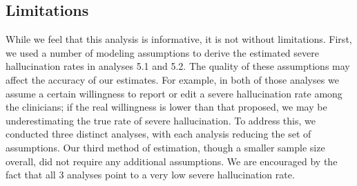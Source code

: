 \documentclass{style/myclass}
\begin{document}
\subsection{Limitations}

While we feel that this analysis is informative, it is not without limitations. First, we used a number of modeling assumptions to derive the estimated severe hallucination rates in analyses 5.1 and 5.2. The quality of these assumptions may affect the accuracy of our estimates. For example, in both of those analyses we assume a certain willingness to report or edit a severe hallucination rate among the clinicians; if the real willingness is lower than that proposed, we may be underestimating the true rate of severe hallucination. To address this, we conducted three distinct analyses, with each analysis reducing the set of assumptions. Our third method of estimation, though a smaller sample size overall, did not require any additional assumptions. We are encouraged by the fact that all 3 analyses point to a very low severe hallucination rate.
\end{document}
